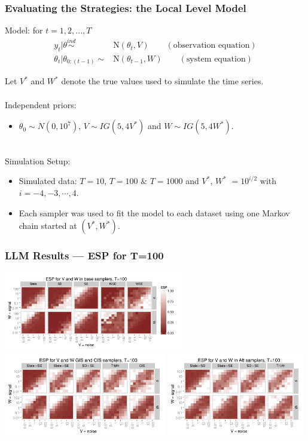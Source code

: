 \documentclass[xcolor=dvipsnames]{beamer}
\newcommand\N{\mathrm{N}}
\begin{document}
\begin{frame}[fragile]
\frametitle{Evaluating the Strategies: the Local Level Model}
Model: for $t=1,2,...,T$
\begin{align*}
    y_t|\theta  \stackrel{ind}{\sim}&\N(\theta_t,V) \qquad (\mbox{observation equation})\\
    \theta_t|\theta_{0:(t-1)} \sim& \N(\theta_{t-1},W) \qquad (\mbox{system equation})
  \end{align*} 

Let $V^*$ and $W^*$ denote the true values used to simulate the time series.\\~\\

Independent priors:
\begin{itemize}
\item $\theta_0\sim N(0, 10^7)$, $V\sim IG(5, 4V^*)$ and $W\sim IG(5, 4W^*)$.\\~\\
\end{itemize}

Simulation Setup:
\begin{itemize}
\item Simulated data: $T=10$, $T=100$ \& $T=1000$ and $V^*$, $W^*$ $=10^{i/2}$ with $i=-4,-3,\cdots,4$.
\item Each sampler was used to fit the model to each dataset using one Markov chain started at $(V^*,W^*)$.
\end{itemize}


\end{frame}

\begin{frame}
\frametitle{LLM Results --- ESP for T=100}
\centering
\includegraphics[width=0.59\textwidth]{basecisESplot100}\\
\includegraphics[width=0.53\textwidth]{altintESplotV100}
\includegraphics[width=0.45\textwidth]{altintESplotW100}
\end{frame}
\end{document}

